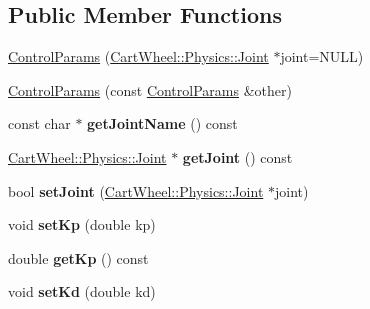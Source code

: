 \subsection*{Public Member Functions}
\begin{DoxyCompactItemize}
\item 
\hyperlink{classCartWheel_1_1Core_1_1ControlParams_a9051298662f8ef3f44bf778115eb7087}{ControlParams} (\hyperlink{classCartWheel_1_1Physics_1_1Joint}{CartWheel::Physics::Joint} $\ast$joint=NULL)
\item 
\hyperlink{classCartWheel_1_1Core_1_1ControlParams_af4ed7e016869736471eef845a654a7ff}{ControlParams} (const \hyperlink{classCartWheel_1_1Core_1_1ControlParams}{ControlParams} \&other)
\item 
\hypertarget{classCartWheel_1_1Core_1_1ControlParams_a7ad47beec47f9d4057ffc439763e72f6}{
const char $\ast$ {\bfseries getJointName} () const }
\label{classCartWheel_1_1Core_1_1ControlParams_a7ad47beec47f9d4057ffc439763e72f6}

\item 
\hypertarget{classCartWheel_1_1Core_1_1ControlParams_a6d4d2211c408bf262e8ac9c4c88eb373}{
\hyperlink{classCartWheel_1_1Physics_1_1Joint}{CartWheel::Physics::Joint} $\ast$ {\bfseries getJoint} () const }
\label{classCartWheel_1_1Core_1_1ControlParams_a6d4d2211c408bf262e8ac9c4c88eb373}

\item 
\hypertarget{classCartWheel_1_1Core_1_1ControlParams_a5f4f076507be797508f3799249864e4e}{
bool {\bfseries setJoint} (\hyperlink{classCartWheel_1_1Physics_1_1Joint}{CartWheel::Physics::Joint} $\ast$joint)}
\label{classCartWheel_1_1Core_1_1ControlParams_a5f4f076507be797508f3799249864e4e}

\item 
\hypertarget{classCartWheel_1_1Core_1_1ControlParams_a7250795ace23d684d9acd5c9e87a9df0}{
void {\bfseries setKp} (double kp)}
\label{classCartWheel_1_1Core_1_1ControlParams_a7250795ace23d684d9acd5c9e87a9df0}

\item 
\hypertarget{classCartWheel_1_1Core_1_1ControlParams_a096b236efae22e1bdedcbd0d08a00748}{
double {\bfseries getKp} () const }
\label{classCartWheel_1_1Core_1_1ControlParams_a096b236efae22e1bdedcbd0d08a00748}

\item 
\hypertarget{classCartWheel_1_1Core_1_1ControlParams_a7d063b54642ad591c0506e1597656cfe}{
void {\bfseries setKd} (double kd)}
\label{classCartWheel_1_1Core_1_1ControlParams_a7d063b54642ad591c0506e1597656cfe}


\end{DoxyCompactItemize}

